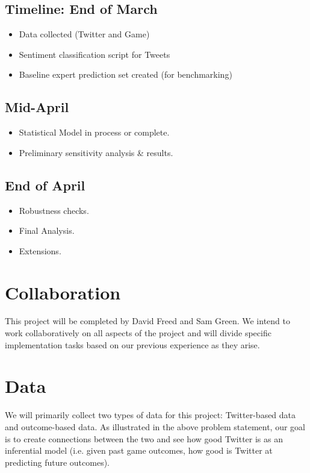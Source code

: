\documentclass[12pt]{article}
\begin{document}
\subsection{Timeline: End of March}
\begin{itemize}
\item Data collected (Twitter and Game)
\item Sentiment classification script for Tweets
\item Baseline expert prediction set created (for benchmarking)
\end{itemize}

\subsection{Mid-April} 
\begin{itemize}
\item Statistical Model in process or complete.
\item Preliminary sensitivity analysis \& results.
\end{itemize}

\subsection{End of April} 
\begin{itemize}
\item Robustness checks.
\item Final Analysis.
\item Extensions.
\end{itemize}

\section{Collaboration}

This project will be completed by David Freed and Sam Green. We intend to work collaboratively on all aspects of the project and will divide specific implementation tasks based on our previous experience as they arise.


\section{Data}

We will primarily collect two types of data for this project: Twitter-based data and outcome-based data. As illustrated in the above problem statement, our goal is to create connections between the two and see how good Twitter is as an inferential model (i.e. given past game outcomes, how good is Twitter at predicting future outcomes). 
\end{document}
